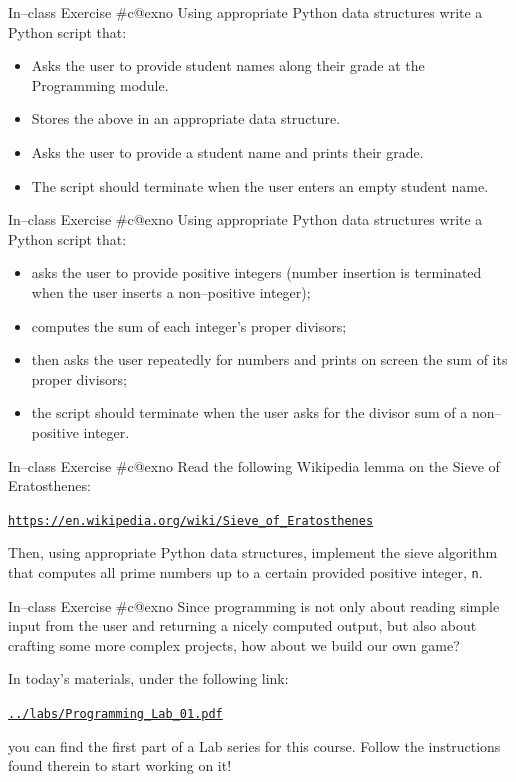 \documentclass[aspectratio=169, 12pt, xcolor=table]{beamer}
\makeatletter
\newcommand{\ohref}[1]{\href{#1}{\texttt{#1}}}
\newcommand{\arabicthree}[1]{\expandafter\@arabicthree\csname c@#1\endcsname}
\newcommand{\@arabicthree}[1]{\ifnum #1<100 0\fi\ifnum #1<10 0\fi\number#1}
\newcounter{exno}
\newcommand{\exno}{\stepcounter{exno}In--class Exercise \#\arabicthree{exno}}
\makeatother
\begin{document}
	\begin{frame}{\exno}
		Using appropriate Python data structures write a Python script that:
		\begin{itemize}
			\item Asks the user to provide student names along their grade at the Programming module.
			\item Stores the above in an appropriate data structure.
			\item Asks the user to provide a student name and prints their grade.
			\item The script should terminate when the user enters an empty student name.
		\end{itemize}
	\end{frame}

	\begin{frame}{\exno}
		Using appropriate Python data structures write a Python script that:
		\begin{itemize}
			\item asks the user to provide positive integers (number insertion is terminated when the user inserts a non--positive integer);
			\item computes the sum of each integer's proper divisors;
			\item then asks the user repeatedly for numbers and prints on screen the sum of its proper divisors;
			\item the script should terminate when the user asks for the divisor sum of a non--positive integer.
		\end{itemize}
	\end{frame}

	\begin{frame}{\exno}
		Read the following Wikipedia lemma on the Sieve of Eratosthenes:
		\begin{center}
			\ohref{https://en.wikipedia.org/wiki/Sieve\_of\_Eratosthenes}
		\end{center}
		Then, using appropriate Python data structures, implement the sieve algorithm that computes all prime numbers up to a certain provided positive integer, \texttt{n}.
	\end{frame}
	
	\begin{frame}{\exno}
		Since programming is not only about reading simple input from the user and returning a nicely computed output, but also about crafting some more complex projects, how about we build our own game?
		
		In today's materials, under the following link:
		\begin{center}
			\ohref{../labs/Programming\_Lab\_01.pdf}
		\end{center}
		you can find the first part of a Lab series for this course. Follow the instructions found therein to start working on it!
	\end{frame}	
	
\end{document}
